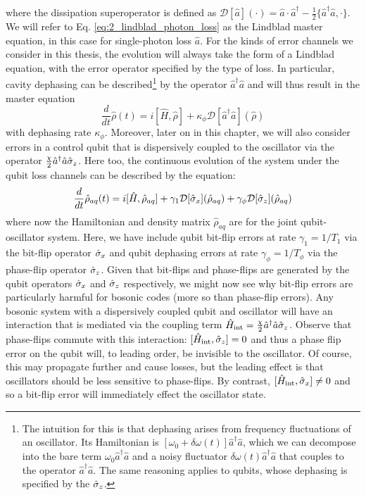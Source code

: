 where the dissipation superoperator is defined as $\mathcal{D}[\hat{a}](\cdot) = \hat{a}\cdot\hat{a}^\dagger - \frac{1}{2}\{\hat{a}^\dagger\hat{a}, \cdot\}$. We will refer to Eq. \eqref{eq:2_lindblad_photon_loss} as the Lindblad master equation, in this case for single-photon loss $\hat{a}$. For the kinds of error channels we consider in this thesis, the evolution will always take the form of a Lindblad equation, with the error operator specified by the type of loss. In particular, cavity dephasing can be described\footnote{The intuition for this is that dephasing arises from frequency fluctuations of an oscillator. Its Hamiltonian is $[\omega_0 + \delta \omega(t)]\hat{a}^\dagger\hat{a}$, which we can decompose into the bare term $\omega_0 \hat{a}^\dagger\hat{a}$ and a noisy fluctuator $\delta \omega(t)\hat{a}^\dagger\hat{a}$ that couples to the operator $\hat{a}^\dagger\hat{a}$. The same reasoning applies to qubits, whose dephasing is specified by the $\hat{\sigma}_z$.} by the operator $\hat{a}^\dagger\hat{a}$ and will thus result in the master equation 
\begin{equation}
    \frac{d}{dt}\hat{\rho}(t) = i[\hat{H}, \hat{\rho}] + \kappa_\phi\mathcal{D}[\hat{a}^\dagger\hat{a}](\hat{\rho})
\end{equation}
with dephasing rate $\kappa_\phi$. Moreover, later on in this chapter, we will also consider errors in a control qubit that is dispersively coupled to the oscillator via the operator $\frac{\chi}{2}\hat{a}^\dagger\hat{a}\hat{\sigma}_z$. Here too, the continuous evolution of the system under the qubit loss channels can be described by the equation:
\begin{equation}
    \frac{d}{dt}\hat{\rho}_{aq}(t) = i[\hat{H}, \hat{\rho}_{aq}] + \gamma_1\mathcal{D}[\hat{\sigma}_x](\hat{\rho}_{aq}) + \gamma_\phi\mathcal{D}[\hat{\sigma}_z](\hat{\rho}_{aq})
\end{equation}
where now the Hamiltonian and density matrix $\hat{\rho}_{aq}$ are for the joint qubit-oscillator system. Here, we have include qubit bit-flip errors at rate $\gamma_1 = 1/T_1$ via the bit-flip operator $\hat{\sigma}_x$ and qubit dephasing errors at rate $\gamma_\phi = 1/T_\phi$ via the phase-flip operator $\hat{\sigma}_z$. Given that bit-flips and phase-flips are generated by the qubit operators $\hat{\sigma}_x$ and $\hat{\sigma}_z$ respectively, we might now see why bit-flip errors are particularly harmful for bosonic codes (more so than phase-flip errors). Any bosonic system with a dispersively coupled qubit and oscillator will have an interaction that is mediated via the coupling term $\hat{H}_{\rm int} = \frac{\chi}{2}\hat{a}^\dagger\hat{a}\hat{\sigma}_z$. Observe that phase-flips commute with this interaction: $[\hat{H}_{\rm int}, \hat{\sigma}_z] = 0$ and thus a phase flip error on the qubit will, to leading order, be invisible to the oscillator. Of course, this may propagate further and cause losses, but the leading effect is that oscillators should be less sensitive to phase-flips. By contrast, $[\hat{H}_{\rm int}, \hat{\sigma}_x] \neq 0$ and so a bit-flip error will immediately effect the oscillator state. 


